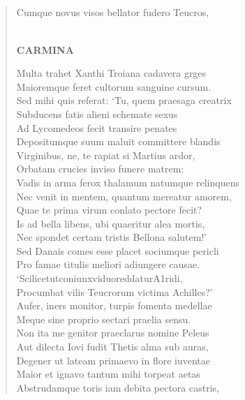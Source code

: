 \documentclass[11pt, a4paper]{report}
\begin{document}
            \subsection*{}
      \begin{verse}
      Cumque novus visos bellator fudero Teucros, \\ 
        ﻿\pagebreak 
    \begin{center} \textbf{CARMINA} \end{center} \marginpar{[164]} Multa trahet Xanthi Troiana cadavera grges \\ Maioremque feret cultorum sanguine cursum. \\ Sed mihi quis referat: ‘Tu, quem praesaga creatrix \\ Subducens fatis alieni schemate sexus \\ Ad Lycomedeos fecit transire penates \\ Depositumque suum maluit committere blandis \\ Virginibus, ne, te rapiat si Martius ardor, \\ Orbatam crucies inviso funere matrem: \\ Vadis in arma ferox thalamum natumque relinquens \\ Nec venit in mentem, quantum mereatur amorem, \\ Quae te prima virum conlato pectore fecit? \\ Is ad bella libens, ubi quaeritur alea mortis, \\ Nec spondet certam tristis Bellona salutem!’ \\ Sed Danais comes esse placet sociumque pericli \\ Pro famae titulis meliori adiungere causae. \\ ‘ScilicetutconiunxviduoreddaturA1ridi, \\ Procumbat vilis Teucrorum victima Achilles?’ \\ Aufer, iners monitor, turpis fomenta medellae \\ Meque sine proprio sectari praelia sensu. \\ Non ita me genitor praeclarus nomine Peleus \\ Aut dilecta Iovi fudit Thetis alma sub auras, \\ Degener ut lateam primaevo in flore iuventae \\ Maior et ignavo tantum mihi torpeat aetas \\ Abstrudamque toris iam debita pectora castris, \\ 

\end{verse}
\end{document}
